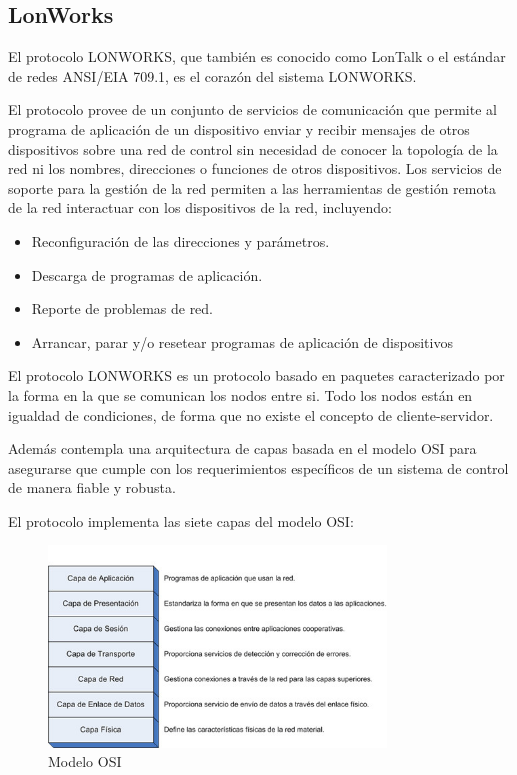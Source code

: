 \subsection{LonWorks}
El protocolo LONWORKS, que también es conocido como LonTalk o el
est\'andar de redes ANSI/EIA 709.1, es el corazón del sistema LONWORKS.


El protocolo provee de un conjunto de servicios de comunicación que
permite al programa de aplicación de un dispositivo enviar y recibir mensajes
de otros dispositivos sobre una red de control sin necesidad de conocer la
topología de la red ni los nombres, direcciones o funciones de otros
dispositivos. Los servicios de soporte para la gestión de la red permiten a las
herramientas de gestión remota de la red interactuar con los dispositivos de la
red, incluyendo:
\begin{itemize}
	\item Reconfiguración de las direcciones y par\'ametros.
	\item Descarga de programas de aplicación.
	\item Reporte de problemas de red.
	\item Arrancar, parar y/o resetear programas de aplicación de dispositivos
	\end{itemize}

El protocolo LONWORKS es un protocolo basado en paquetes caracterizado por la forma en la que se comunican los nodos entre si. Todo los nodos est\'an en igualdad de condiciones, de forma que no existe el concepto de cliente-servidor.



Adem\'as contempla una arquitectura de capas basada en el modelo OSI para
asegurarse que cumple con los requerimientos específicos de un sistema de
control de manera fiable y robusta.


El protocolo implementa las siete capas del modelo OSI:
\begin{figure}[htbp]
	\centering
		\includegraphics[width=0.80\textwidth]{imagenes/modelo_osi.jpg}
	\caption{Modelo OSI}
	\label{fig:modelo_osi}
\end{figure}




